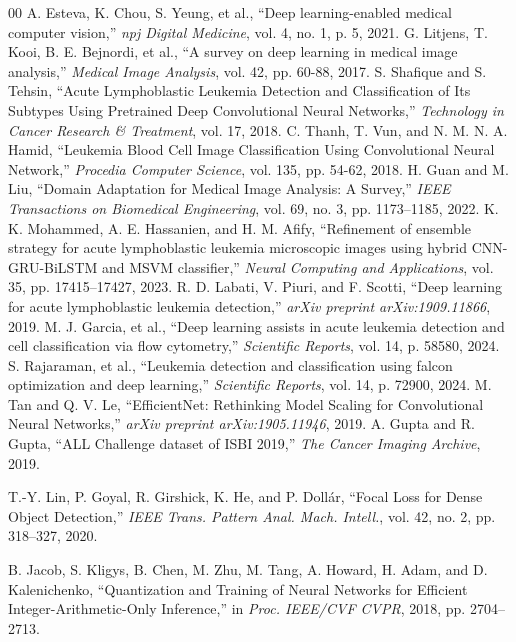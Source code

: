 \documentclass[journal]{IEEEtran}
\begin{document}
    \begin{thebibliography}{00}
     A. Esteva, K. Chou, S. Yeung, et al., ``Deep learning-enabled medical computer vision,'' \emph{npj Digital Medicine}, vol. 4, no. 1, p. 5, 2021.
     G. Litjens, T. Kooi, B. E. Bejnordi, et al., ``A survey on deep learning in medical image analysis,'' \emph{Medical Image Analysis}, vol. 42, pp. 60-88, 2017.
     S. Shafique and S. Tehsin, ``Acute Lymphoblastic Leukemia Detection and Classification of Its Subtypes Using Pretrained Deep Convolutional Neural Networks,'' \emph{Technology in Cancer Research \& Treatment}, vol. 17, 2018.
     C. Thanh, T. Vun, and N. M. N. A. Hamid, ``Leukemia Blood Cell Image Classification Using Convolutional Neural Network,'' \emph{Procedia Computer Science}, vol. 135, pp. 54-62, 2018.
     H. Guan and M. Liu, ``Domain Adaptation for Medical Image Analysis: A Survey,'' \emph{IEEE Transactions on Biomedical Engineering}, vol. 69, no. 3, pp. 1173--1185, 2022.
     K. K. Mohammed, A. E. Hassanien, and H. M. Afify, ``Refinement of ensemble strategy for acute lymphoblastic leukemia microscopic images using hybrid CNN-GRU-BiLSTM and MSVM classifier,'' \emph{Neural Computing and Applications}, vol. 35, pp. 17415--17427, 2023.
     R. D. Labati, V. Piuri, and F. Scotti, ``Deep learning for acute lymphoblastic leukemia detection,'' \emph{arXiv preprint arXiv:1909.11866}, 2019.
     M. J. Garcia, et al., ``Deep learning assists in acute leukemia detection and cell classification via flow cytometry,'' \emph{Scientific Reports}, vol. 14, p. 58580, 2024.
     S. Rajaraman, et al., ``Leukemia detection and classification using falcon optimization and deep learning,'' \emph{Scientific Reports}, vol. 14, p. 72900, 2024.
     M. Tan and Q. V. Le, ``EfficientNet: Rethinking Model Scaling for Convolutional Neural Networks,'' \emph{arXiv preprint arXiv:1905.11946}, 2019.
     A. Gupta and R. Gupta, ``ALL Challenge dataset of ISBI 2019,'' \emph{The Cancer Imaging Archive}, 2019.

    T.-Y. Lin, P. Goyal, R. Girshick, K. He, and P. Dollár,
    ``Focal Loss for Dense Object Detection,''
    \textit{IEEE Trans. Pattern Anal. Mach. Intell.},
    vol. 42, no. 2, pp. 318--327, 2020.

    B. Jacob, S. Kligys, B. Chen, M. Zhu, M. Tang, A. Howard,
    H. Adam, and D. Kalenichenko,
    ``Quantization and Training of Neural Networks for Efficient
    Integer-Arithmetic-Only Inference,''
    in \textit{Proc. IEEE/CVF CVPR}, 2018, pp. 2704--2713.
    \end{thebibliography}

    
\end{document}
